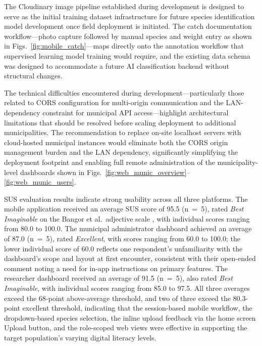 \documentclass{icsthesis}
\begin{document}
\begin{mainmatter}
The Cloudinary image pipeline established during development is designed to serve as the
initial training dataset infrastructure for future species identification model
development once field deployment is initiated. The catch documentation workflow---photo
capture followed by manual species and weight entry as shown in
Figs.~\ref{fig:mobile_catch}---maps directly onto the
annotation workflow that supervised learning model training would require, and the
existing data schema was designed to accommodate a future AI classification backend
without structural changes.

The technical difficulties encountered during development---particularly those related to
CORS configuration for multi-origin communication and the LAN-dependency constraint for
municipal API access---highlight architectural limitations that should be resolved before
scaling deployment to additional municipalities. The recommendation to replace on-site
localhost servers with cloud-hosted municipal instances would eliminate both the CORS
origin management burden and the LAN dependency, significantly simplifying the deployment
footprint and enabling full remote administration of the municipality-level dashboards
shown in Figs.~\ref{fig:web_munic_overview}--\ref{fig:web_munic_users}.

SUS evaluation results indicate strong usability across all three platforms. The mobile
application received an average SUS score of 95.5 (n~=~5), rated \textit{Best
Imaginable} on the Bangor et al.\ adjective scale \cite{Bangor2008}, with individual
scores ranging from 80.0 to 100.0. The municipal administrator dashboard achieved an
average of 87.0 (n~=~5), rated \textit{Excellent}, with scores ranging from 60.0 to
100.0; the lower individual score of 60.0 reflects one respondent's unfamiliarity with
the dashboard's scope and layout at first encounter, consistent with their open-ended
comment noting a need for in-app instructions on primary features. The researcher
dashboard received an average of 91.5 (n~=~5), also rated \textit{Best Imaginable},
with individual scores ranging from 85.0 to 97.5. All three averages exceed the 68-point
above-average threshold, and two of three exceed the 80.3-point excellent threshold,
indicating that the session-based mobile workflow, the dropdown-based species selection, the inline upload feedback via the home screen
Upload button, and the role-scoped web views were effective in supporting the target
population's varying digital literacy levels.


\end{mainmatter}
\end{document}
